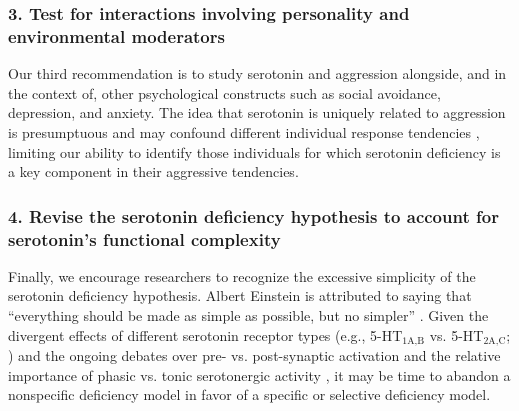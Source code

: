 \subsubsection{3.  Test for interactions involving personality and environmental moderators}
Our third recommendation is to study serotonin and aggression alongside, and in the context of, other psychological constructs such as social avoidance, depression, and anxiety. The idea that serotonin is uniquely related to aggression is presumptuous and may confound different individual response tendencies \parencite[see][]{Deakin2003, Tops2009}, limiting our ability to identify those individuals for which serotonin deficiency is a key component in their aggressive tendencies. 


\subsubsection{4. Revise the serotonin deficiency hypothesis to account for serotonin's functional complexity}
Finally, we encourage researchers to recognize the excessive simplicity of the serotonin deficiency hypothesis. Albert Einstein is attributed to saying that ``everything should be made as simple as possible, but no simpler'' \parencite[475]{Einstein2010}. Given the divergent effects of different serotonin receptor types (e.g., 5-HT$_{\textrm{1A,B}}$ vs. 5-HT$_{\textrm{2A,C}}$; ) and the ongoing debates over pre- vs. post-synaptic activation \parencite{Boer2005, Olivier2005} and the relative importance of phasic vs. tonic serotonergic activity \parencite{Boer2005, Erp2000, Vegt2003}, it may be time to abandon a nonspecific deficiency model in favor of a specific or selective deficiency model. 


% 
% 
% 


